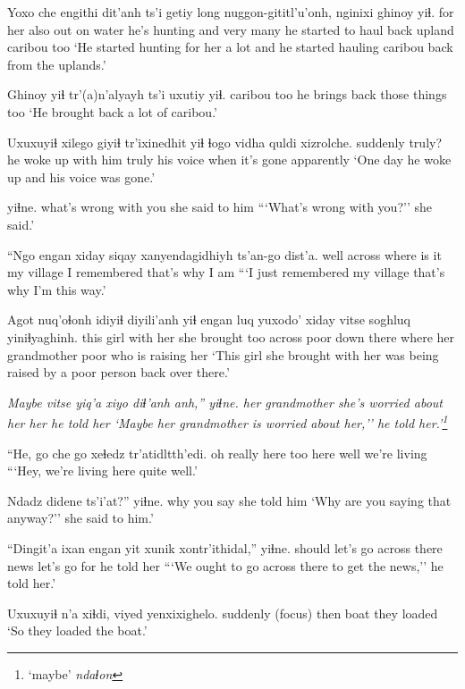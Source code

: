 \documentclass[12pt]{article}
\begin{document}
\gll Yoxo che engithi dit'anh ts'i getiy long nuggon-gititl'u'onh, nginixi ghinoy yiɬ. 
{for her} also {out on water} {he's hunting} and very many {he started to haul back} upland caribou too
\glt `He started hunting for her a lot and he started hauling caribou back from the uplands.' 
\glend

\gll Ghinoy yiɬ tr'(a)n'alyayh ts'i uxutiy yiɬ. 
caribou too {he brings back} {} {those things} too
\glt `He brought back a lot of caribou.' 
\glend

\gll Uxuxuyiɬ xilego giyiɬ tr'ixinedhit yiɬ ɬogo vidha quldi xizrolche. 
suddenly truly? {} {he woke up} {with him} truly {his voice} {when it's gone} apparently
\glt `One day he woke up and his voice was gone.' 
\glend

 yiɬne. 
{what's wrong with you} {she said to him}
\glt ```What's wrong with you?'' she said.' 
\glend

\gll ``Ngo engan xiday siqay xanyendagidhiyh ts'an-go dist'a. 
well across {where is it} {my village} {I remembered} {that's why} {I am}
\glt ```I just remembered my village that's why I'm this way.' 
\glend

\gll Agot nuq'oɬonh idiyiɬ diyili'anh yiɬ engan luq yuxodo' xiday vitse soghluq yiniɬyaghinh. 
this girl {with her} {she brought} too across poor {down there} where {her grandmother} poor {who is raising her}
\glt `This girl she brought with her was being raised by a poor person back over there.' 
\glend

\gll \em Maybe vitse {yiq'a xiyo diɬ'anh} anh,'' yiɬne. 
{} {her grandmother} {she's worried about her} her {he told her}
\glt `Maybe her grandmother is worried about her,'' he told her.'\footnote{`maybe' \em ndaɬon}
\glend

\gll ``He, go che go xeɬedz tr'atidltth'edi.
{oh really}  here too here well {we're living}
\glt ```Hey, we're living here quite well.' 
\glend

\gll Ndadz didene ts'i'at?'' yiɬne. 
why {you say} {} {she told him}
\glt `Why are you saying that anyway?'' she said to him.' 
\glend

\gll ``Dingit'a ixan engan yit xunik xontr'ithidal,'' yiɬne. 
should {let's go} across there news {let's go for} {he told her}
\glt ```We ought to go across there to get the news,'' he told her.' 
\glend

\gll Uxuxuyiɬ n'a xiɬdi, viyed yenxixighelo. 
suddenly {(focus)} then boat {they loaded} 
\glt `So they loaded the boat.'
\glend
\end{document}
